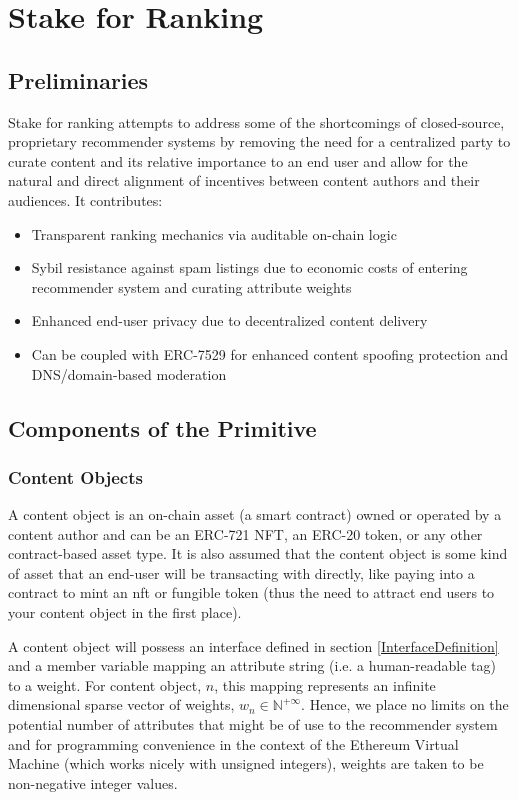 \section{Stake for Ranking} 
\label{section:ProtocolDescription}

\subsection{Preliminaries}
Stake for ranking attempts to address some of the shortcomings of closed-source, proprietary recommender systems by removing the need for a centralized party to curate content and its relative importance to an end user and allow for the natural and direct alignment of incentives between content authors and their audiences. It contributes:
\begin{itemize}
    \item Transparent ranking mechanics via auditable on-chain logic
    \item Sybil resistance against spam listings due to economic costs of entering recommender system and curating attribute weights
    \item Enhanced end-user privacy due to decentralized content delivery
    \item Can be coupled with ERC-7529 \cite{chapman2023erc7529} for enhanced content spoofing protection and DNS/domain-based moderation
\end{itemize}

\subsection{Components of the Primitive}
\subsubsection{Content Objects}
\label{ContentObjectDefinition}

A content object is an on-chain asset (a smart contract) owned or operated by a content author and can be an ERC-721 NFT, an ERC-20 token, or any other contract-based asset type. It is also assumed that the content object is some kind of asset that an end-user will be transacting with directly, like paying into a contract to mint an nft or fungible token (thus the need to attract end users to your content object in the first place). 

A content object will possess an interface defined in section \ref{InterfaceDefinition} and a member variable mapping an attribute string (i.e. a human-readable tag) to a weight. For content object, $n$, this mapping represents an infinite dimensional sparse vector of weights, $w_n \in \mathbb{N}^{+\infty}$. Hence, we place no limits on the potential number of attributes that might be of use to the recommender system and for programming convenience in the context of the Ethereum Virtual Machine \cite{wood2014ethereum} (which works nicely with unsigned integers), weights are taken to be non-negative integer values. 

